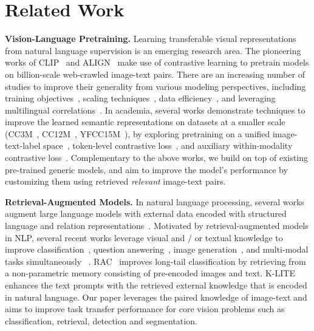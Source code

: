 \documentclass[10pt,twocolumn,letterpaper]{article}
\renewcommand{\paragraph}[1]{\vspace{1.25mm}\noindent\textbf{#1}}
\begin{document}
\section{Related Work}
\label{sec:related}
\vspace{-2mm}
\paragraph{Vision-Language Pretraining.}
Learning transferable visual representations from natural language supervision is an emerging research area.  The pioneering works of CLIP~\cite{radford2021learning} and ALIGN~\cite{jia2021scaling} make use of contrastive learning to pretrain models on billion-scale web-crawled image-text pairs. There are an increasing number of studies to improve their generality from various modeling perspectives, including training objectives~\cite{geng2022multimodal,dong2022maskclip,yu2022coca,mustafa2022multimodal,zhai2022lit,gao2022pyramidclip}, scaling techniques~\cite{chen2022pali,yu2022coca,pham2021combined}, data efficiency~\cite{li2021supervision,lee2022uniclip}, and leveraging multilingual correlations~\cite{jain2021mural,chen2022pali}.
In academia, several works demonstrate techniques to improve the learned semantic representations on datasets at a smaller scale (\eg CC3M~\cite{sharma2018conceptual}, CC12M~\cite{changpinyo2021conceptual}, YFCC15M~\cite{radford2021learning,thomee2016yfcc100m}), by exploring pretraining on a unified image-text-label space~\cite{yang2022unicl}, token-level contrastive loss~\cite{yao2021filip}, and auxiliary within-modality contrastive loss~\cite{mu2021slip,yang2022vision,you2022learning}.
Complementary to the above works, we build on top of existing pre-trained generic models, and aim to improve the model's performance by customizing them using retrieved \emph{relevant} image-text pairs.

\paragraph{Retrieval-Augmented Models.}
In natural language processing, several works augment large language models with external data encoded with structured language and relation representations~\cite{peters2019knowledge,guu2020realm,lewis2020retrieval,liu2020k,yu2021dict,borgeaud2021improving,khandelwal2019generalization}.
Motivated by retrieval-augmented models in NLP, several recent works leverage visual and / or textual knowledge to improve classification~\cite{long2022retrieval}, question answering~\cite{wu2021multi,marino2021krisp,yang2021empirical,chen2022murag}, image generation~\cite{blattmann2022retrieval,sheynin2022knn,chen2022re,zhou2022lafite2}, and multi-modal tasks simultaneously ~\cite{yasunaga2022retrieval}.  RAC~\cite{long2022retrieval} improves long-tail classification by retrieving from a non-parametric memory consisting of pre-encoded images and text. K-LITE~\cite{shen2022klite} enhances the text prompts with the retrieved external knowledge that is encoded in natural language.
Our paper leverages the paired knowledge of image-text and aims to improve task transfer performance for core vision problems such as classification, retrieval, detection and segmentation.
\end{document}
